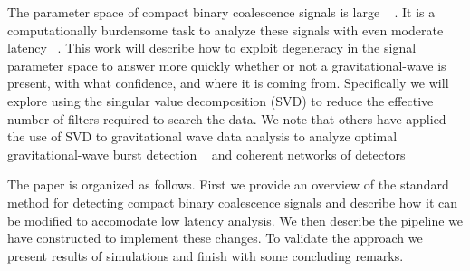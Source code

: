 The parameter space of compact binary coalescence signals is large
~\cite{Owen:1995tm, Owen:1998dk} .  It is a
computationally burdensome task to analyze these signals with even moderate
latency ~\cite{Abbott:2007xi}.  
This work will describe how to exploit degeneracy in the signal
parameter space to answer more quickly whether or not a gravitational-wave 
is present, with what confidence, and where it is coming from. Specifically
we will explore using the singular value decomposition (SVD) to reduce the
effective number of filters required to search the data.  We note that others
have applied the use of SVD to gravitational wave data analysis to analyze
optimal gravitational-wave burst detection 
~\cite{bradyraymajumder2004, heng2008} and coherent networks 
of detectors ~\cite{wen2008} 

The paper is organized as follows.  First we provide an overview of the 
standard method for detecting compact binary coalescence signals and
describe how it can be modified to accomodate low latency analysis.  We
then describe the pipeline we have constructed to implement these changes.
To validate the approach we present results of simulations and finish
with some concluding remarks. 
